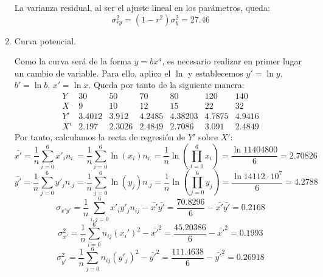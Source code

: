 \begin{ejercicio}
\begin{enumerate}
        La varianza residual, al ser el ajuste lineal en los parámetros, queda:
        \begin{equation*}
            \sigma_{ry}^2 = (1-r^2)\sigma_y^2 = 27.46
        \end{equation*}
        
        \item Curva potencial. \label{Ej:Ej14.Ap_C}
        
        Como la curva será de la forma $y=bx^a$, es necesario realizar en primer lugar un cambio de variable. Para ello, aplico el $\ln$ y establecemos $y'=\ln y$, $b'=\ln b$, $x'=\ln x$. Queda por tanto de la siguiente manera:
        \begin{equation*}
            \begin{array}{c|cccccc}
                Y & 30 & 50 & 70 & 80 & 120 & 140 \\ \hline
                X & 9 & 10 & 12 & 15 & 22 & 32 \\ \hline \hline
                Y' & 3.4012 & 3.912 & 4.2485 & 4.38203 & 4.7875 & 4.9416 \\ \hline
                X' & 2.197 & 2.3026 & 2.4849 & 2.7086 & 3.091 & 2.4849
            \end{array}
        \end{equation*}
        Por tanto, calculamos la recta de regresión de $Y'$ sobre $X'$:
        \begin{equation*}
            \bar{x'} = \frac{1}{n}\sum_{i=0}^6 x'_{i}n_{i.} =  \frac{1}{n}\sum_{i=0}^6 \ln (x_{i})n_{i.}=\frac{1}{n}\ln\left(\prod_{i=0}^6 x_i\right) = \frac{\ln 11404800}{6} = 2.70826
        \end{equation*}
        \begin{equation*}
            \bar{y'} = \frac{1}{n}\sum_{j=0}^6 y'_{j}n_{.j} =  \frac{1}{n}\sum_{j=0}^6 \ln (y_{j})n_{.j}=\frac{1}{n}\ln\left(\prod_{j=0}^6 y_j\right) = \frac{\ln 14112\cdot10^7}{6} = 4.2788
        \end{equation*}
        \begin{equation*}
            \sigma_{x'y'} =
            \frac{1}{n}\sum_{i,j=0}^6 x'_iy'_j n_{ij} - \bar{x'}\bar{y'} = \frac{70.8296}{6} - \bar{x'}\bar{y'} = 0.2168
        \end{equation*}        
        \begin{equation*}
            \sigma_{x'}^2
            = \frac{1}{n}\sum_{i=0}^6 n_{ij} (x_i')^2 - \bar{x'}^2
            = \frac{45.20386}{6} - \bar{x'}^2 = 0.1993
        \end{equation*}
        \begin{equation*}
            \sigma_{y'}^2 = \frac{1}{n}\sum_{j=0}^6 n_{ij}(y'_j)^2 - \bar{y'}^2 = \frac{111.4638}{6} - \bar{y'}^2 = 0.26918
        \end{equation*}


\end{enumerate}
\end{ejercicio}
